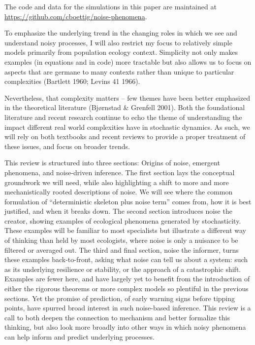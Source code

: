 \documentclass[
  authoryear,
  preprint,
  3p]{elsarticle}
\begin{document}
The code and data for the simulations in this paper are maintained at
\url{https://github.com/cboettig/noise-phenomena}.

To emphasize the underlying trend in the changing roles in which we see
and understand noisy processes, I will also restrict my focus to
relatively simple models primarily from population ecology context.
Simplicity not only makes examples (in equations and in code) more
tractable but also allows us to focus on aspects that are germane to
many contexts rather than unique to particular complexities (Bartlett
1960; Levins 41 1966).

Nevertheless, that complexity matters -- few themes have been better
emphasized in the theoretical literature (Bjørnstad \& Grenfell 2001).
Both the foundational literature and recent research continue to echo
the theme of understanding the impact different real world complexities
have in stochastic dynamics. As such, we will rely on both textbooks and
recent reviews to provide a proper treatment of these issues, and focus
on broader trends.

This review is structured into three sections: Origins of noise,
emergent phenomena, and noise-driven inference. The first section lays
the conceptual groundwork we will need, while also highlighting a shift
to more and more mechanistically rooted descriptions of noise. We will
see where the common formulation of ``deterministic skeleton plus noise
term'' comes from, how it is best justified, and when it breaks down.
The second section introduces noise the creator, showing examples of
ecological phenomena generated by stochasticity. These examples will be
familiar to most specialists but illustrate a different way of thinking
than held by most ecologists, where noise is only a nuisance to be
filtered or averaged out. The third and final section, noise the
informer, turns these examples back-to-front, asking what noise can tell
us about a system: such as its underlying resilience or stability, or
the approach of a catastrophic shift. Examples are fewer here, and have
largely yet to benefit from the introduction of either the rigorous
theorems or more complex models so plentiful in the previous sections.
Yet the promise of prediction, of early warning signs before tipping
points, have spurred broad interest in such noise-based inference. This
review is a call to both deepen the connection to mechanism and better
formalize this thinking, but also look more broadly into other ways in
which noisy phenomena can help inform and predict underlying processes.
\end{document}
